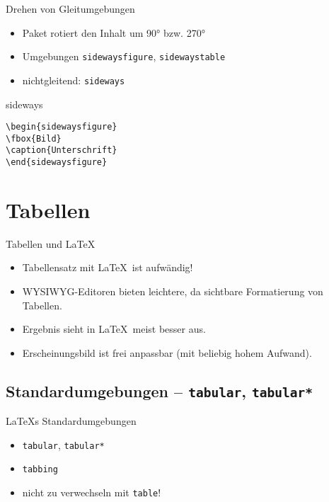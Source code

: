 \documentclass[
	vorläufig=false,
	datum=2017-11-10,
	titel={Gleitumgebungen und Tabellen},
	web=false,
	noshortverb=true,
	aspectratio=1610,
	mo,
]{../tex/latexkurs-slides}
\begin{document}
\begin{frame}[fragile]{Drehen von Gleitumgebungen}
\begin{itemize}
\item Paket  rotiert den Inhalt um 90° bzw. 270°
\item Umgebungen \verb/sidewaysfigure/, \verb/sidewaystable/
\item nichtgleitend: \verb/sideways/
\end{itemize}
\begin{LTXexample}[width=.4\textwidth]
\centering
\begin{sideways}
[Bild]
\end{sideways}
\end{LTXexample}
\end{frame}

\begin{frame}[fragile]{sideways}
\begin{lstlisting}
\begin{sidewaysfigure}
\fbox{Bild}
\caption{Unterschrift}
\end{sidewaysfigure}
\end{lstlisting}
\end{frame}

\section{Tabellen}
\begin{frame}{Tabellen und \LaTeX}
\begin{itemize}
\item[$\pmb-$] Tabellensatz mit \LaTeX\ ist aufwändig!
\item[$\pmb-$] WYSIWYG-Editoren bieten leichtere, da sichtbare Formatierung von Tabellen.
\item[$\pmb+$] Ergebnis sieht in \LaTeX\ meist besser aus.
\item[$\pmb+$] Erscheinungsbild ist frei anpassbar (mit beliebig hohem Aufwand).
\end{itemize}
\end{frame}

\subsection[tabular]{Standardumgebungen – \texttt{tabular}, \texttt{tabular*}}
\begin{frame}[fragile]{\LaTeX{}s Standardumgebungen}
\begin{itemize}
\item \verb/tabular/, \verb/tabular*/
\item \verb/tabbing/
\item \alert{nicht zu verwechseln mit \texttt{table}!}
\end{itemize}
\end{frame}
\end{document}
